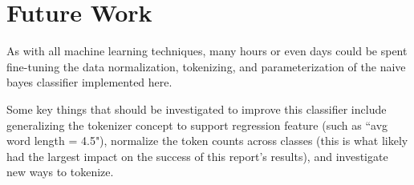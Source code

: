 \section{Future Work}
\label{section:futurework}
As with all machine learning techniques, many hours or even days could be spent fine-tuning the data normalization,
tokenizing, and parameterization of the naive bayes classifier implemented here.

Some key things that should be investigated to improve this classifier include generalizing the tokenizer concept
to support regression feature (such as ``avg word length = 4.5"), normalize the token counts across classes (this is
what likely had the largest impact on the success of this report's results), and investigate new ways to tokenize.
